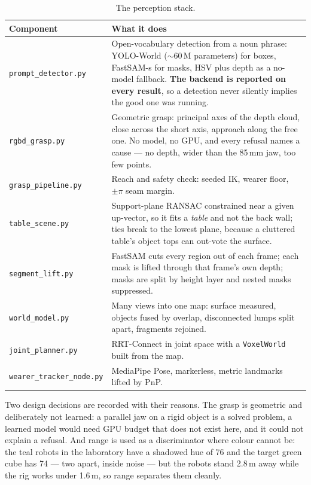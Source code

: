 \documentclass[11pt,a4paper,oneside]{report}
\newcommand{\code}[1]{\texttt{\small #1}}
\newcommand{\file}[1]{\texttt{\small #1}}
\begin{document}
\begin{table}[H]
\centering
\small
\begin{tabularx}{\textwidth}{@{}lX@{}}
\toprule
\textbf{Component} & \textbf{What it does} \\
\midrule
\file{prompt\_detector.py} &
Open-vocabulary detection from a noun phrase: YOLO-World ($\sim$60\,M
parameters) for boxes, FastSAM-s for masks, HSV plus depth as a no-model
fallback. \textbf{The backend is reported on every result}, so a detection
never silently implies the good one was running. \\
\file{rgbd\_grasp.py} &
Geometric grasp: principal axes of the depth cloud, close across the short
axis, approach along the free one. No model, no GPU, and every refusal names a
cause --- no depth, wider than the 85\,mm jaw, too few points. \\
\file{grasp\_pipeline.py} &
Reach and safety check: seeded IK, wearer floor, $\pm\pi$ seam margin. \\
\file{table\_scene.py} &
Support-plane RANSAC constrained near a given up-vector, so it fits a
\emph{table} and not the back wall; ties break to the lowest plane, because a
cluttered table's object tops can out-vote the surface. \\
\file{segment\_lift.py} &
FastSAM cuts every region out of each frame; each mask is lifted through that
frame's own depth; masks are split by height layer and nested masks suppressed. \\
\file{world\_model.py} &
Many views into one map: surface measured, objects fused by overlap,
disconnected lumps split apart, fragments rejoined. \\
\file{joint\_planner.py} &
RRT-Connect in joint space with a \code{VoxelWorld} built from the map. \\
\file{wearer\_tracker\_node.py} &
MediaPipe Pose, markerless, metric landmarks lifted by PnP. \\
\bottomrule
\end{tabularx}
\caption{The perception stack.}
\end{table}

Two design decisions are recorded with their reasons. The grasp is geometric
and deliberately not learned: a parallel jaw on a rigid object is a solved
problem, a learned model would need GPU budget that does not exist here, and it
could not explain a refusal. And range is used as a discriminator where colour
cannot be: the teal robots in the laboratory have a shadowed hue of 76 and the
target green cube has 74 --- two apart, inside noise --- but the robots stand
2.8\,m away while the rig works under 1.6\,m, so range separates them cleanly.
\end{document}
